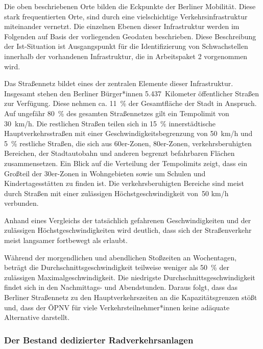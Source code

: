 Die oben beschriebenen Orte bilden die Eckpunkte der Berliner Mobilität. Diese stark frequentierten Orte, sind durch eine vielschichtige Verkehrsinfrastruktur miteinander vernetzt. Die einzelnen Ebenen dieser Infrastruktur werden im Folgenden auf Basis der vorliegenden Geodaten beschrieben. Diese Beschreibung der Ist-Situation ist Ausgangspunkt für die Identifizierung von Schwachstellen innerhalb der vorhandenen Infrastruktur, die in Arbeitspaket 2 vorgenommen wird.

Das Straßennetz bildet eines der zentralen Elemente dieser Infrastruktur. Insgesamt stehen den Berliner Bürger*innen 5.437~Kilometer öffentlicher Straßen zur Verfügung. Diese nehmen ca. 11~\% der Gesamtfläche der Stadt in Anspruch. Auf ungefähr 80~\% des gesamten Straßennetzes gilt ein Tempolimit von 30~km/h. Die restlichen Straßen teilen sich in 15~\% innerstädtische Hauptverkehrsstraßen mit einer Geschwindigkeitsbegrenzung von 50~km/h und 5~\% restliche Straßen, die sich aus 60er-Zonen, 80er-Zonen, verkehrsberuhigten Bereichen, der Stadtautobahn und anderen begrenzt befahrbaren Flächen zusammensetzen. Ein Blick auf die Verteilung der Tempolimits zeigt, dass ein Großteil der 30er-Zonen in Wohngebieten sowie um Schulen und Kindertagesstätten zu finden ist. Die verkehrsberuhigten Bereiche sind meist durch Straßen mit einer zulässigen Höchstgeschwindigkeit von~50 km/h verbunden.


Anhand eines Vergleichs der tatsächlich gefahrenen Geschwindigkeiten und der zulässigen Höchstgeschwindigkeiten wird deutlich, dass sich der Straßenverkehr meist langsamer fortbewegt als erlaubt.


Während der morgendlichen und abendlichen Stoßzeiten an Wochentagen, beträgt die Durchschnittsgeschwindigkeit teilweise weniger als 50~\% der zulässigen Maximalgeschwindigkeit. Die niedrigste Durchschnittsgeschwindigkeit findet sich in den Nachmittags- und Abendstunden. Daraus folgt, dass das Berliner Straßennetz zu den Hauptverkehrszeiten an die Kapazitätsgrenzen stößt und, dass der ÖPNV für viele Verkehrsteilnehmer*innen keine adäquate Alternative darstellt.

\subsubsection{Der Bestand dedizierter Radverkehrsanlagen}

